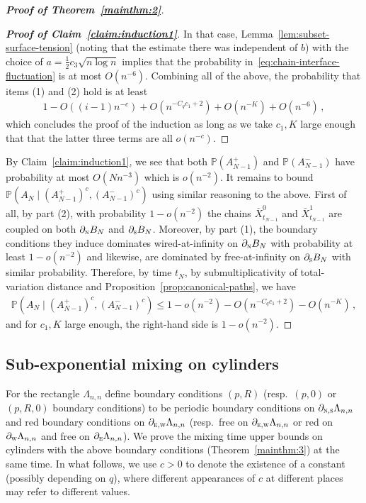 \documentclass[reqno,11pt]{amsart}
\numberwithin{equation}{section}
\theoremstyle{definition}{
\newtheorem{example}[theorem]{Example}
\newtheorem{definition}[theorem]{Definition}
\newtheorem*{definition*}{Definition}
\newtheorem{problem}[theorem]{Problem}
\newtheorem{question}[theorem]{Question}
\newtheorem{remark}[theorem]{Remark}
}
\newcommand{\north}{{\textsc{n}}}
\newcommand{\south}{{\textsc{s}}}
\newcommand{\east}{{\textsc{e}}}
\newcommand{\west}{{\textsc{w}}}
\begin{document}
\begin{proof}[\textbf{\emph{Proof of Theorem~\ref{mainthm:2}}}]
\begin{proof}[\textbf{\emph{Proof of Claim~\ref{claim:induction1}}}]
In that case, Lemma~\ref{lem:subset-surface-tension} (noting that the estimate there was independent of $b$) with the choice of $a=\frac12 c_3 \sqrt {n \log n}$ implies that the probability in~\eqref{eq:chain-interface-fluctuation} is at most $O(n^{-6})$. Combining all of the above, the probability that items (1) and (2) hold is at least 
\begin{align*}
1-O((i-1)n^{-c})+O(n^{-C_q c_1+2})+O(n^{-K})+O(n^{-6})\,,
\end{align*}
which concludes the proof of the induction as long as we take $c_1, K$ large enough that that the latter three terms are all $o(n^{-c})$. \end{proof}

By Claim~\ref{claim:induction1}, we see that both $\mathbb P(A_{N-1}^+)$ and $\mathbb P(A_{N-1}^-)$ have probability at most $O(N n^{-3})$ which is $o(n^{-2})$. It remains to bound $\mathbb P(A_N \mid (A_{N-1}^+)^c, (A_{N-1}^-)^c)$ using similar reasoning to the above. First of all, by part (2), with probability $1-o(n^{-2})$ the chains $\bar X_{t_{N-1}}^{0}$ and $\bar X_{t_{N-1}}^1$ are coupled on both $\partial_\north B_N$ and $\partial_\south B_N$. Moreover, by part (1), the boundary conditions they induce dominates wired-at-infinity on $\partial_{\north}B_N$ with probability at least $1-o(n^{-2})$ and likewise, are dominated by free-at-infinity on $\partial_\south B_N$ with similar probability. Therefore, by time $t_{N}$, by submultiplicativity of total-variation distance and Proposition~\ref{prop:canonical-paths}, we have 
\begin{align*}
\mathbb P(A_{N} \mid (A_{N-1}^+)^c,(A_{N-1}^-)^c) \leq 1- o(n^{-2}) -O(n^{-C_q c_1 + 2})-O(n^{-K})\,,
\end{align*}
and for $c_1,K$ large enough, the right-hand side is $1-o(n^{-2})$.
\end{proof}

\subsection{Sub-exponential mixing on cylinders}\label{sub:subexp-cylinders}

For the rectangle $\Lambda_{n,n}$ define boundary conditions $(p,R)$ (resp.\ $(p,0)$ or $(p,R,0)$ boundary conditions) to be periodic boundary conditions on $\partial_{\north,\south} \Lambda_{n,n}$ and red boundary conditions on $\partial_{\east,\west} \Lambda_{n,n}$ (resp.\ free on $\partial_{\east,\west}\Lambda_{n,n}$ or red on $\partial_{\west} \Lambda_{n,n}$ and free on $\partial_\east \Lambda_{n,n}$). 
We prove the mixing time upper bounds on cylinders with the above boundary conditions (Theorem~\ref{mainthm:3}) at the same time. In what follows, we use $c>0$ to denote the existence of a constant (possibly depending on $q$), where different appearances of $c$ at different places may refer to different values.
\end{document}
